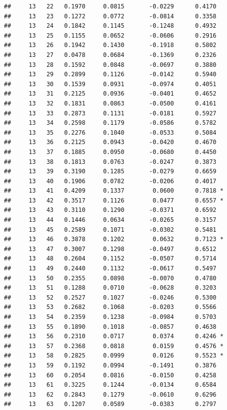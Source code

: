 \documentclass[
]{article}
\begin{document}
\begin{verbatim}
##     13   22   0.1970     0.0815       -0.0229      0.4170  
##     13   23   0.1272     0.0772       -0.0814      0.3358  
##     13   24   0.1842     0.1145       -0.1248      0.4932  
##     13   25   0.1155     0.0652       -0.0606      0.2916  
##     13   26   0.1942     0.1430       -0.1918      0.5802  
##     13   27   0.0478     0.0684       -0.1369      0.2326  
##     13   28   0.1592     0.0848       -0.0697      0.3880  
##     13   29   0.2899     0.1126       -0.0142      0.5940  
##     13   30   0.1539     0.0931       -0.0974      0.4051  
##     13   31   0.2125     0.0936       -0.0401      0.4652  
##     13   32   0.1831     0.0863       -0.0500      0.4161  
##     13   33   0.2873     0.1131       -0.0181      0.5927  
##     13   34   0.2598     0.1179       -0.0586      0.5782  
##     13   35   0.2276     0.1040       -0.0533      0.5084  
##     13   36   0.2125     0.0943       -0.0420      0.4670  
##     13   37   0.1885     0.0950       -0.0680      0.4450  
##     13   38   0.1813     0.0763       -0.0247      0.3873  
##     13   39   0.3190     0.1285       -0.0279      0.6659  
##     13   40   0.1906     0.0782       -0.0206      0.4017  
##     13   41   0.4209     0.1337        0.0600      0.7818 *
##     13   42   0.3517     0.1126        0.0477      0.6557 *
##     13   43   0.3110     0.1290       -0.0371      0.6592  
##     13   44   0.1446     0.0634       -0.0265      0.3157  
##     13   45   0.2589     0.1071       -0.0302      0.5481  
##     13   46   0.3878     0.1202        0.0632      0.7123 *
##     13   47   0.3007     0.1298       -0.0497      0.6512  
##     13   48   0.2604     0.1152       -0.0507      0.5714  
##     13   49   0.2440     0.1132       -0.0617      0.5497  
##     13   50   0.2355     0.0898       -0.0070      0.4780  
##     13   51   0.1288     0.0710       -0.0628      0.3203  
##     13   52   0.2527     0.1027       -0.0246      0.5300  
##     13   53   0.2682     0.1068       -0.0203      0.5566  
##     13   54   0.2359     0.1238       -0.0984      0.5703  
##     13   55   0.1890     0.1018       -0.0857      0.4638  
##     13   56   0.2310     0.0717        0.0374      0.4246 *
##     13   57   0.2368     0.0818        0.0159      0.4576 *
##     13   58   0.2825     0.0999        0.0126      0.5523 *
##     13   59   0.1192     0.0994       -0.1491      0.3876  
##     13   60   0.2054     0.0816       -0.0150      0.4258  
##     13   61   0.3225     0.1244       -0.0134      0.6584  
##     13   62   0.2843     0.1279       -0.0610      0.6296  
##     13   63   0.1207     0.0589       -0.0383      0.2797  

\end{verbatim}
\end{document}
